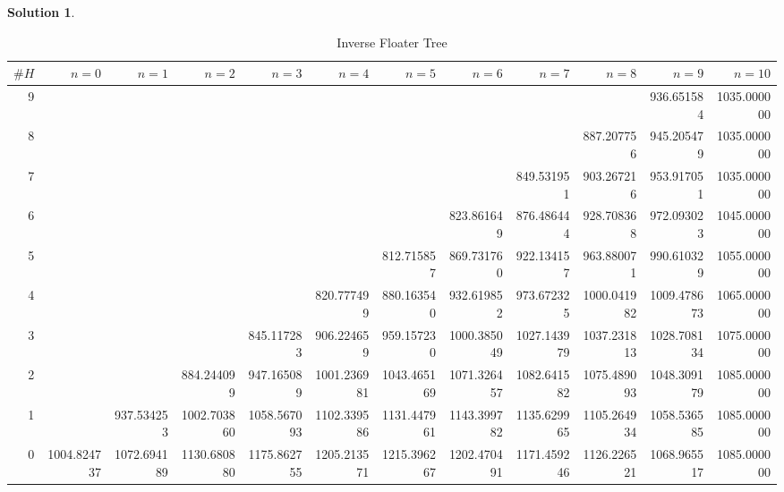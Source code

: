 \documentclass[a4paper, 10pt]{article}
\theoremstyle{definition}
\theoremstyle{hSol}
\newtheorem*{solution}{Solution}
\begin{document}
\begin{solution}
\begin{landscape}
\begin{table}[H]
  \centering
  \small
  \caption{Inverse Floater Tree}
    \begin{tabular}{|r|rrrrrrrrrrr|}
    \hline
    $\#H$& $n=0$     & $n=1$     & $n=2$     & $n=3$     & $n=4$     & $n=5$     & $n=6$     & $n=7$     & $n=8$     & $n=9$     & $n=10$\\
    \hline
    9     &       &       &       &       &       &       &       &       &       & 936.651584 & 1035.000000 \\
    8     &       &       &       &       &       &       &       &       & 887.207756 & 945.205479 & 1035.000000 \\
    7     &       &       &       &       &       &       &       & 849.531951 & 903.267216 & 953.917051 & 1035.000000 \\
    6     &       &       &       &       &       &       & 823.861649 & 876.486444 & 928.708368 & 972.093023 & 1045.000000 \\
    5     &       &       &       &       &       & 812.715857 & 869.731760 & 922.134157 & 963.880071 & 990.610329 & 1055.000000 \\
    4     &       &       &       &       & 820.777499 & 880.163540 & 932.619852 & 973.672325 & 1000.041982 & 1009.478673 & 1065.000000 \\
    3     &       &       &       & 845.117283 & 906.224659 & 959.157230 & 1000.385049 & 1027.143979 & 1037.231813 & 1028.708134 & 1075.000000 \\
    2     &       &       & 884.244099 & 947.165089 & 1001.236981 & 1043.465169 & 1071.326457 & 1082.641582 & 1075.489093 & 1048.309179 & 1085.000000 \\
    1     &       & 937.534253 & 1002.703860 & 1058.567093 & 1102.339586 & 1131.447961 & 1143.399782 & 1135.629965 & 1105.264934 & 1058.536585 & 1085.000000 \\
    0     & 1004.824737 & 1072.694189 & 1130.680880 & 1175.862755 & 1205.213571 & 1215.396267 & 1202.470491 & 1171.459246 & 1126.226521 & 1068.965517 & 1085.000000 \\
    \hline
    \end{tabular}%
  \label{tab:addlabel}%
\end{table}%



\end{landscape}
\end{solution}
\end{document}
